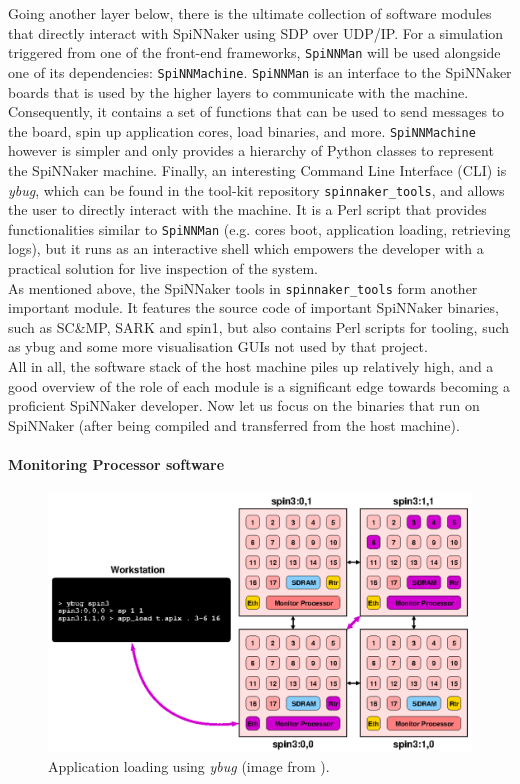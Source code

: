 Going another layer below, there is the ultimate collection of software modules that directly interact with SpiNNaker using SDP over UDP/IP. For a simulation triggered from one of the front-end frameworks, \texttt{SpiNNMan} will be used alongside one of its dependencies: \texttt{SpiNNMachine}. \texttt{SpiNNMan} is an interface to the SpiNNaker boards that is used by the higher layers to communicate with the machine. Consequently, it contains a set of functions that can be used to send messages to the board, spin up application cores, load binaries, and more. \texttt{SpiNNMachine} however is simpler and only provides a hierarchy of Python classes to represent the SpiNNaker machine. Finally, an interesting Command Line Interface (CLI) is \textit{ybug}, which can be found in the tool-kit repository \texttt{spinnaker\_tools}, and allows the user to directly interact with the machine. It is a Perl script that provides functionalities similar to \texttt{SpiNNMan} (e.g. cores boot, application loading, retrieving logs), but it runs as an interactive shell which empowers the developer with a practical solution for live inspection of the system. \\

As mentioned above, the SpiNNaker tools in \texttt{spinnaker\_tools} form another important module. It features the source code of important SpiNNaker binaries, such as SC\&MP, SARK and spin1, but also contains Perl scripts for tooling, such as ybug and some more visualisation GUIs not used by that project. \\

All in all, the software stack of the host machine piles up relatively high, and a good overview of the role of each module is a significant edge towards becoming a proficient SpiNNaker developer. Now let us focus on the binaries that run on SpiNNaker (after being compiled and transferred from the host machine).


\paragraph{Monitoring Processor software}

\begin{figure}[hbtp]
\centering
\includegraphics[width = 1\hsize]{figures/ybug.png}
\caption{Application loading using \textit{ybug} (image from \cite{ybug}).}
\label{fig:ybug}
\end{figure}

